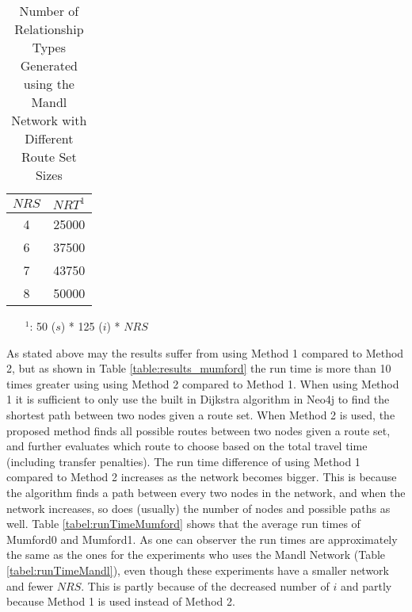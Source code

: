 \begin{table}[H]
    \centering
    \hspace*{-1.0cm}
    \begin{tabular}{|c|c|}
        \hline
        \textbf{$NRS$} & \textbf{$NRT^1$}\\
        \hline
        4 & 25000\\
        \hline
        6 & 37500\\
        \hline
        7 & 43750\\
        \hline
        8 & 50000\\
        \hline
    \end{tabular}
    \caption{Number of Relationship Types Generated using the Mandl Network with Different Route Set Sizes}
    \begin{itemize}[noitemsep]
    \item[$^1$:] 50 ($s$) * 125 ($i$) * $NRS$
    \end{itemize} 
    \label{tabel:numberOfRelationshipTypes}
\end{table}

As stated above may the results suffer from using Method 1 compared to Method 2, but as shown in Table \vref{table:results_mumford} the run time is more than 10 times greater using using Method 2 compared to Method 1. When using Method 1 it is sufficient to only use the built in Dijkstra algorithm in Neo4j to find the shortest path between two nodes given a route set. When Method 2 is used, the proposed method finds all possible routes between two nodes given a route set, and further evaluates which route to choose based on the total travel time (including transfer penalties). The run time difference of using Method 1 compared to Method 2 increases as the network becomes bigger. This is because the algorithm finds a path between every two nodes in the network, and when the network increases, so does (usually) the number of nodes and possible paths as well. Table \vref{tabel:runTimeMumford} shows that the average run times of Mumford0 and Mumford1. As one can observer the run times are approximately the same as the ones for the experiments who uses the Mandl Network (Table \vref{tabel:runTimeMandl}), even though these experiments have a smaller network and fewer $NRS$. This is partly because of the decreased number of $i$ and partly because Method 1 is used instead of Method 2.  

